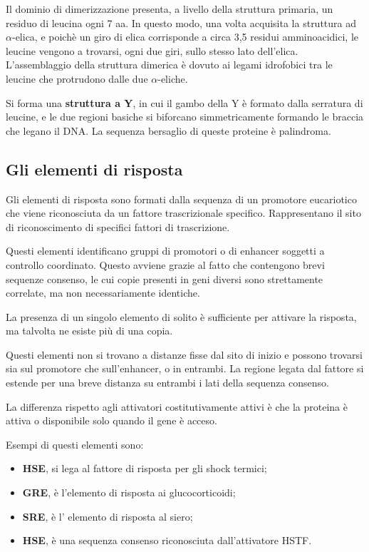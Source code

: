 \documentclass[11pt]{book}
\begin{document}
Il dominio di dimerizzazione presenta, a livello della struttura
primaria, un residuo di leucina ogni 7 aa. In questo modo, una volta
acquisita la struttura ad \(\alpha\)-elica, e poichè un giro di elica
corrisponde a circa 3,5 residui amminoacidici, le leucine vengono a
trovarsi, ogni due giri, sullo stesso lato dell'elica. L'assemblaggio
della struttura dimerica è dovuto ai legami idrofobici tra le leucine
che protrudono dalle due \(\alpha\)-eliche.

Si forma una \textbf{struttura a Y}, in cui il gambo della Y è formato
dalla serratura di leucine, e le due regioni basiche si biforcano
simmetricamente formando le braccia che legano il DNA. La sequenza
bersaglio di queste proteine è palindroma.

\subsection{Gli elementi di risposta}\label{gli-elementi-di-risposta}

Gli elementi di risposta sono formati dalla sequenza di un promotore
eucariotico che viene riconosciuta da un fattore trascrizionale
specifico. Rappresentano il sito di riconoscimento di specifici fattori
di trascrizione.

Questi elementi identificano gruppi di promotori o di enhancer soggetti
a controllo coordinato. Questo avviene grazie al fatto che contengono
brevi sequenze consenso, le cui copie presenti in geni diversi sono
strettamente correlate, ma non necessariamente identiche.

La presenza di un singolo elemento di solito è sufficiente per attivare
la risposta, ma talvolta ne esiste più di una copia.

Questi elementi non si trovano a distanze fisse dal sito di inizio e
possono trovarsi sia sul promotore che sull'enhancer, o in entrambi. La
regione legata dal fattore si estende per una breve distanza su entrambi
i lati della sequenza consenso.

La differenza rispetto agli attivatori costitutivamente attivi è che la
proteina è attiva o disponibile solo quando il gene è acceso.

Esempi di questi elementi sono:

\begin{itemize}
\itemsep1pt\parskip0pt
\item
  \textbf{HSE}, si lega al fattore di risposta per gli shock termici;
\item
  \textbf{GRE}, è l'elemento di risposta ai glucocorticoidi;
\item
  \textbf{SRE}, è l' elemento di risposta al siero;
\item
  \textbf{HSE}, è una sequenza consenso riconosciuta dall'attivatore
  HSTF.
\end{itemize}
\end{document}
